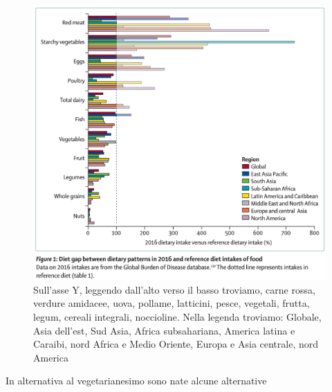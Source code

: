 \documentclass[12pt]{book} %
\begin{document}
\begin{figure}[H]
  \begin{minipage}{17cm}
    \includegraphics[width=17cm]{images/Libro-img023.png}
    \caption{Sull'asse Y, leggendo dall'alto verso il basso troviamo, carne rossa, verdure
amidacee, uova, pollame, latticini, pesce, vegetali, frutta, legum, cereali integrali, noccioline. 
Nella legenda troviamo: Globale, Asia dell'est, Sud Asia, Africa subsahariana, America latina e Caraibi, nord Africa e Medio Oriente, Europa e Asia centrale, nord America }
  \end{minipage}
\end{figure}

\bigskip

In alternativa al vegetarianesimo sono nate alcune alternative
\end{document}
